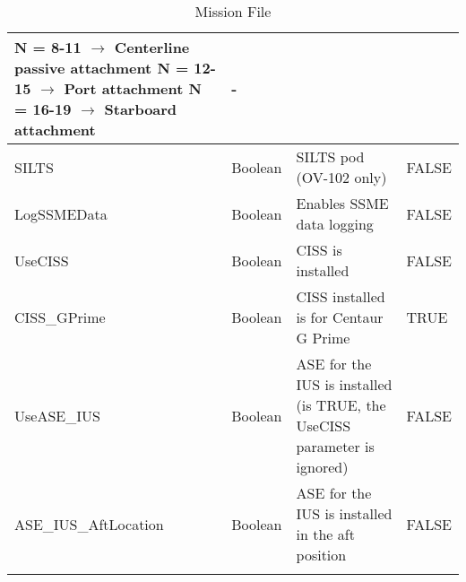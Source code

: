 \documentclass[Space_Shuttle_Ultra_Manual.tex]{subfiles}
\begin{document}
\begin{longtable}{|l|p{1.5cm}|p{7.5cm}|l|}
N = 8-11 $\rightarrow$ Centerline passive attachment\newline
N = 12-15 $\rightarrow$ Port attachment\newline
N = 16-19 $\rightarrow$ Starboard attachment & - \\
	\hline
	\rule{0pt}{2ex}
	SILTS & Boolean & SILTS pod (OV-102 only) & FALSE\\
	\hline
	\rule{0pt}{2ex}
	LogSSMEData & Boolean & Enables SSME data logging & FALSE\\
	\hline
	\rule{0pt}{2ex}
	UseCISS & Boolean & CISS is installed & FALSE\\
	\hline
	\rule{0pt}{2ex}
	CISS\_GPrime & Boolean & CISS installed is for Centaur G Prime & TRUE\\
	\hline
	\rule{0pt}{2ex}
	UseASE\_IUS & Boolean & ASE for the IUS is installed (is TRUE, the UseCISS parameter is ignored) & FALSE\\
	\hline
	\rule{0pt}{2ex}
	ASE\_IUS\_AftLocation & Boolean & ASE for the IUS is installed in the aft position & FALSE\\
	\hline
	\caption{Mission File}
  \label{tab:Mission_File}
	\end{longtable}
\end{document}
